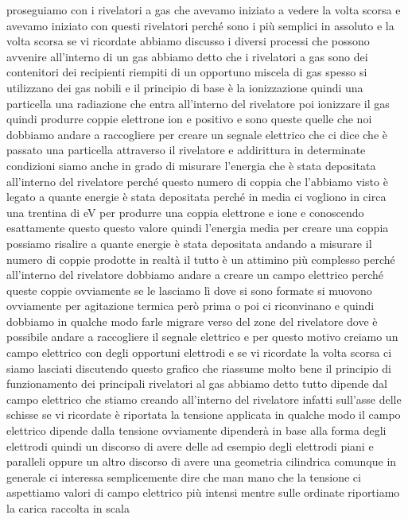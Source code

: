 {proseguiamo con i rivelatori a gas che avevamo iniziato a vedere la volta scorsa e avevamo iniziato con questi rivelatori perché sono i più semplici in assoluto e la volta scorsa se vi ricordate abbiamo discusso i diversi processi che possono avvenire all'interno di un gas abbiamo detto che i rivelatori a gas sono dei contenitori dei recipienti riempiti di un opportuno miscela di gas spesso si utilizzano dei gas nobili e il principio di base è la ionizzazione quindi una particella una radiazione che entra all'interno del rivelatore poi ionizzare il gas quindi produrre coppie elettrone ion e positivo e sono queste quelle che noi dobbiamo andare a raccogliere per creare un segnale elettrico che ci dice che è passato una particella attraverso il rivelatore e addirittura in determinate condizioni siamo anche in grado di misurare l'energia che è stata depositata all'interno del rivelatore perché questo numero di coppia che l'abbiamo visto è legato a quante energie è stata depositata perché in media ci vogliono in circa una trentina di eV per produrre una coppia elettrone e ione e conoscendo esattamente questo questo valore quindi l'energia media per creare una coppia possiamo risalire a quante energie è stata depositata andando a misurare il numero di coppie prodotte in realtà il tutto è un attimino più complesso perché all'interno del rivelatore dobbiamo andare a creare un campo elettrico perché queste coppie ovviamente se le lasciamo lì dove si sono formate si muovono ovviamente per agitazione termica però prima o poi ci riconvinano e quindi dobbiamo in qualche modo farle migrare verso del zone del rivelatore dove è possibile andare a raccogliere il segnale elettrico e per questo motivo creiamo un campo elettrico con degli opportuni elettrodi e se vi ricordate la volta scorsa ci siamo lasciati discutendo questo grafico che riassume molto bene il principio di funzionamento dei principali rivelatori al gas abbiamo detto tutto dipende dal campo elettrico che stiamo creando all'interno del rivelatore infatti sull'asse delle schisse se vi ricordate è riportata la tensione applicata in qualche modo il campo elettrico dipende dalla tensione ovviamente dipenderà in base alla forma degli elettrodi quindi un discorso di avere delle ad esempio degli elettrodi piani e paralleli oppure un altro discorso di avere una geometria cilindrica comunque in generale ci interessa semplicemente dire che man mano che la tensione ci aspettiamo valori di campo elettrico più intensi mentre sulle ordinate riportiamo la carica raccolta in scala 

}
